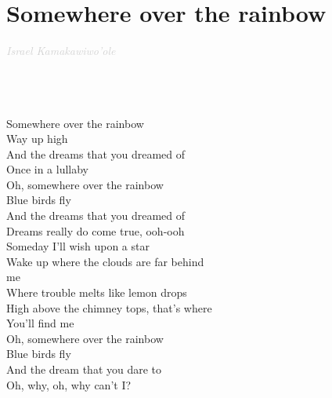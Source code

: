 \documentclass[a5paper, 10pt]{book}
\begin{document}
\newpage
\section{Somewhere over the rainbow}\textcolor{lightgray}{\textit{Israel Kamakawiwo'ole}}\\~\\
\begin{minipage}[t]{0.7\textwidth}
~\\~\\
Somewhere over the rainbow\\
Way up high\\
And the dreams that you dreamed of\\
Once in a lullaby\\

Oh, somewhere over the rainbow\\
Blue birds fly\\
And the dreams that you dreamed of\\
Dreams really do come true, ooh-ooh\\

\hspace*{5mm}Someday I'll wish upon a star\\
\hspace*{5mm}Wake up where the clouds are far behind \\
\hspace*{5mm}me\\
\hspace*{5mm}Where trouble melts like lemon drops\\
\hspace*{5mm}High above the chimney tops, that's where\\
\hspace*{5mm}You'll find me\\

Oh, somewhere over the rainbow\\
Blue birds fly\\
And the dream that you dare to\\
Oh, why, oh, why can't I?\\
\end{minipage}
\end{document}
